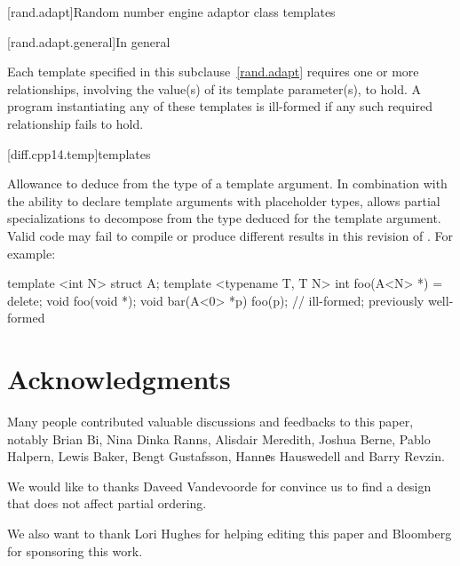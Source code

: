 \documentclass{wg21}
\begin{document}
[rand.adapt]{Random number engine adaptor class templates}

[rand.adapt.general]{In general}

\pnum
Each template specified in this subclause~\ref{rand.adapt}
requires one or more relationships,
involving the value(s) of its  template parameter(s), to hold.
A program instantiating any of these templates
is ill-formed
if any such required relationship fails to hold.



[diff.cpp14.temp]{templates}

\change
Allowance to deduce from the type of a  template argument.
\rationale
In combination with the ability to declare
 template arguments with placeholder types,
allows partial specializations to decompose
from the type deduced for the  template argument.
\effect
Valid \CppXIV{} code may fail to compile
or produce different results in this revision of \Cpp{}.
For example:
\begin{codeblock}
    template <int N> struct A;
    template <typename T, T N> int foo(A<N> *) = delete;
    void foo(void *);
    void bar(A<0> *p) {
        foo(p);           // ill-formed; previously well-formed
    }
\end{codeblock}


\section{Acknowledgments}
Many people contributed valuable discussions and feedbacks to this paper, notably
Brian Bi, Nina Dinka Ranns, Alisdair Meredith, Joshua Berne, Pablo Halpern, Lewis Baker, Bengt Gustafsson,
Hannеs Hauswedell and Barry Revzin.

We would like to thanks Daveed Vandevoorde for convince us to find a design that does not affect partial ordering.

We also want to thank Lori Hughes for helping editing this paper and Bloomberg for sponsoring this work.






\renewcommand{\section}[2]{}%

\begin{thebibliography}{9}


\end{thebibliography}
\end{document}
